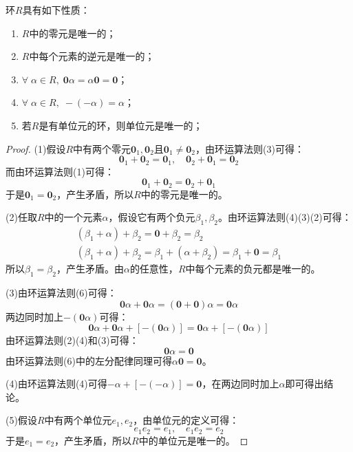 \begin{property}
	环$R$具有如下性质：
	\begin{enumerate}
		\item $R$中的零元是唯一的；
		\item $R$中每个元素的逆元是唯一的；
		\item $\forall\;\alpha\in R,\;\mathbf{0}\alpha=\alpha\mathbf{0}=\mathbf{0}$；
		\item $\forall\;\alpha\in R,\;-(-\alpha)=\alpha$；
		\item 若$R$是有单位元的环，则单位元是唯一的；
	\end{enumerate}
\end{property}
\begin{proof}
	(1)假设$R$中有两个零元$\mathbf{0}_1,\mathbf{0}_2$且$\mathbf{0}_1\ne\mathbf{0}_2$，由环运算法则(3)可得：
	\begin{equation*}
		\mathbf{0}_1+\mathbf{0}_2=\mathbf{0}_1,\quad\mathbf{0}_2+\mathbf{0}_1=\mathbf{0}_2
	\end{equation*}
	而由环运算法则(1)可得：
	\begin{equation*}
		\mathbf{0}_1+\mathbf{0}_2=\mathbf{0}_2+\mathbf{0}_1
	\end{equation*}
	于是$\mathbf{0}_1=\mathbf{0}_2$，产生矛盾，所以$R$中的零元是唯一的。\par
	(2)任取$R$中的一个元素$\alpha$，假设它有两个负元$\beta_1,\beta_2$。由环运算法则(4)(3)(2)可得：
	\begin{gather*}
		(\beta_1+\alpha)+\beta_2=\mathbf{0}+\beta_2=\beta_2 \\
		(\beta_1+\alpha)+\beta_2=\beta_1+(\alpha+\beta_2)=\beta_1+\mathbf{0}=\beta_1
	\end{gather*}
	所以$\beta_1=\beta_2$，产生矛盾。由$\alpha$的任意性，$R$中每个元素的负元都是唯一的。\par
	(3)由环运算法则(6)可得：
	\begin{equation*}
		\mathbf{0}\alpha+\mathbf{0}\alpha=(\mathbf{0}+\mathbf{0})\alpha=\mathbf{0}\alpha
	\end{equation*}
	两边同时加上$-(\mathbf{0}\alpha)$可得：
	\begin{equation*}
		\mathbf{0}\alpha+\mathbf{0}\alpha+[-(\mathbf{0}\alpha)]=\mathbf{0}\alpha+[-(\mathbf{0}\alpha)]
	\end{equation*}
	由环运算法则(2)(4)和(3)可得：
	\begin{equation*}
		\mathbf{0}\alpha=\mathbf{\mathbf{0}}
	\end{equation*}
	由环运算法则(6)中的左分配律同理可得$\alpha\mathbf{0}=\mathbf{0}$。\par
	(4)由环运算法则(4)可得$-\alpha+[-(-\alpha)]=\mathbf{0}$，在两边同时加上$\alpha$即可得出结论。\par
	(5)假设$R$中有两个单位元$e_1,e_2$，由单位元的定义可得：
	\begin{equation*}
		e_1e_2=e_1,\quad e_1e_2=e_2
	\end{equation*}
	于是$e_1=e_2$，产生矛盾，所以$R$中的单位元是唯一的。
\end{proof}
